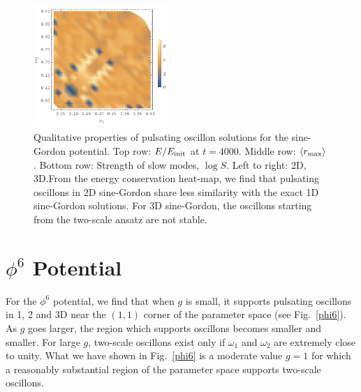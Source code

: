 \documentclass{report}
\begin{document}
\begin{figure}[p]
  \includegraphics[width=0.45\textwidth]{plot/slow-mode-logscale-sine-3d.png}
  \caption{Qualitative properties of pulsating oscillon solutions for the sine-Gordon potential. Top row: $E/E_{\rm init}$ at $t=4000$.
    Middle row: $\langle r_{\rm max}\rangle$.
    Bottom row: Strength of slow modes, $\log{S}$.\quad
    Left to right: 2D, 3D.\qquad From the energy conservation heat-map, we find that pulsating oscillons in 2D sine-Gordon share less similarity with the exact 1D sine-Gordon solutions. For 3D sine-Gordon, the oscillons starting from the two-scale ansatz are not stable.}\label{sine2d3d}
\end{figure}

\section{$\phi^6$ Potential}
For the $\phi^6$ potential, we find that when $g$ is small, it supports pulsating oscillons in 1, 2 and 3D near the $(1,1)$ corner of the parameter space (see Fig.~\ref{phi6}). As $g$ goes larger, the region which supports oscillons becomes smaller and smaller. For large $g$, two-scale oscillons exist only if  $\omega_1$ and $\omega_2$ are extremely close to unity. What we have shown in Fig.~\ref{phi6} is a moderate value $g=1$ for which a reasonably substantial region of the parameter space supports two-scale oscillons.
\end{document}
